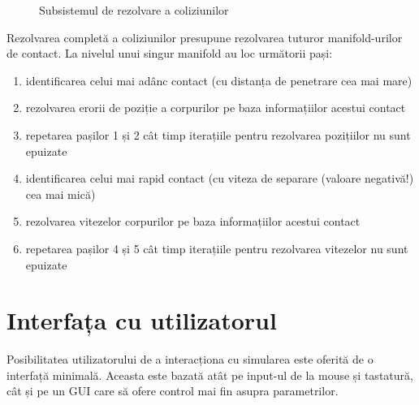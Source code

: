 \documentclass[12pt,a4paper]{report}
\begin{document}
\begin{figure}[H]
	\centering
	\caption[]{Subsistemul de rezolvare a coliziunilor}
	\label{fig:CollisionResolutionSmall}
\end{figure}

Rezolvarea completă a coliziunilor presupune rezolvarea tuturor manifold-urilor de contact. La nivelul unui singur manifold au loc următorii pași:
\begin{enumerate}
	\item identificarea celui mai adânc contact (cu distanța de penetrare cea mai mare)
	\item rezolvarea erorii de poziție a corpurilor pe baza informațiilor acestui contact
	\item repetarea pașilor 1 și 2 cât timp iterațiile pentru rezolvarea pozițiilor nu sunt epuizate
	\item identificarea celui mai rapid contact (cu viteza de separare (valoare negativă!) cea mai mică)
	\item rezolvarea vitezelor corpurilor pe baza informațiilor acestui contact
	\item repetarea pașilor 4 și 5 cât timp iterațiile pentru rezolvarea vitezelor nu sunt epuizate
\end{enumerate}

\section{Interfața cu utilizatorul}
Posibilitatea utilizatorului de a interacționa cu simularea este oferită de o interfață minimală. Aceasta este bazată atât pe input-ul de la mouse și tastatură, cât și pe un GUI care să ofere control mai fin asupra parametrilor.
\end{document}
